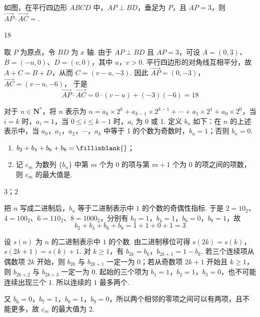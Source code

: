\begin{problem}
如图，在平行四边形 \(ABCD\) 中，\(AP \perp BD\)，垂足为 \(P\)，且 \(AP = 3\)，则 \(\overrightarrow{AP} \cdot \overrightarrow{AC} =\)\fillinblank{}.
\end{problem}

\begin{answer}
18
\end{answer}

\begin{solution}
取 \(P\) 为原点，令 \(BD\) 为 \(x\) 轴. 由于 \(AP\perp BD\) 且 \(AP=3\)，可设
\(A=(0,3)\)、\(B=(-u,0)\)、\(D=(v,0)\)，其中 \(u\)，\(v>0\). 平行四边形的对角线互相平分，故
\(A+C=B+D\)，从而 \(C=(v-u,-3)\). 因此
\(\overrightarrow{AP}=(0,-3)\)，\(\overrightarrow{AC}=(v-u,-6)\)，
于是
\[
\overrightarrow{AP}\cdot\overrightarrow{AC}=0\cdot(v-u)+(-3)(-6)=18
\]
\end{solution}

\begin{problem}
对于 \(n \in \mathbf{N}^*\)，将 \(n\) 表示为 \(n = a_k \times 2^k + a_{k-1} \times 2^{k-1} + \cdots + a_1 \times 2^1 + a_0 \times 2^0\)，当 \(i = k\) 时，\(a_i = 1\)，当 \(0 \leqslant i \leqslant k - 1\) 时，\(a_i\) 为 0 或 1. 定义 \(b_n\) 如下：在 \(n\) 的上述表示中，当 \(a_0\)，\(a_1\)，\(a_2\)，\(\cdots\)，\(a_k\) 中等于 1 的个数为奇数时，\(b_n = 1\)；否则 \(b_n = 0\).
\begin{enumerate}
\item \( b_{2}+b_{4}+b_{6}+b_{8}=\fillinblank{}\)；
\item 记 \(c_{m}\) 为数列 \(\{b_{n}\}\) 中第 \(m\) 个为 0 的项与第 \(m + 1\) 个为 0 的项之间的项数，则 \(c_{m}\) 的最大值是\fillinblank{}.
\end{enumerate}
\end{problem}

\begin{answer}
\(3\)；\(2\)
\end{answer}

\begin{solution}
把 \(n\) 写成二进制后，\(b_n\) 等于二进制表示中 \(1\) 的个数的奇偶性指标. 于是
\(2=10_2\)、\(4=100_2\)、\(6=110_2\)、\(8=1000_2\)，分别有
\(b_2=1\)，\(b_4=1\)，\(b_6=0\)，\(b_8=1\)，故
\[
b_2+b_4+b_6+b_8=1+1+0+1=3
\]

设 \(s(n)\) 为 \(n\) 的二进制表示中 \(1\) 的个数. 由二进制移位可得
\(s(2k)=s(k)\)，\(s(2k+1)=s(k)+1\).
对 \(k\geqslant1\)，有 \(b_{2k}=b_k\)，\(b_{2k+1}=1-b_k\). 若三个连续项从偶数项
\(2k\) 开始，则 \(b_{2k}\) 与 \(b_{2k+1}\) 一定一为 \(0\)；若从奇数项 \(2k+1\) 开始且
\(k\geqslant1\)，则 \(b_{2k+2}\) 与 \(b_{2k+3}\) 一定一为 \(0\). 起始的三个项为
\(b_1=1\)，\(b_2=1\)，\(b_3=0\)，也不可能连续出现三个 \(1\). 所以连续的 \(1\) 最多两个.

又 \(b_6=0\)，\(b_7=1\)，\(b_8=1\)，\(b_9=0\)，所以两个相邻的零项之间可以有两项，且不能更多，故 \(c_m\) 的最大值为 \(2\).
\end{solution}

